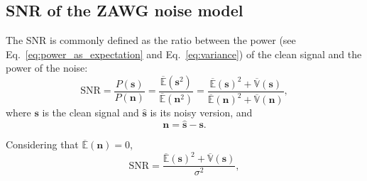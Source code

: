 \begin{comment}
If $\mathbf{s}=\mathbf{0}$ (a constant signal
with zeros), Equations \ref{eq:E_ZAWG} and \ref{eq:V_ZAWG}
reduce to
\begin{equation}
  \mathbb{E}(\mathbf{\hat{\mathbf{s}}}) = 0,
\end{equation}
and
\begin{equation}
  \mathbb{V}(\hat{\mathbf{s}}) = \sigma^2,
\end{equation}
respectively, and if $\mathbf{s}=\mathbf{1}$ (a constant signal with
ones)
\begin{equation}
  \mathbb{E}(\hat{\mathbf{s}}) = \mathbb{E}(\mathbf{1}) = 1,
\end{equation}
and
\begin{equation}
  \mathbb{V}(\hat{\mathbf{s}}) = \sigma^2.
\end{equation}
\end{comment}

\subsection{\gls{SNR} of the \gls{ZAWG} noise model}

The \gls{SNR} is commonly defined as the ratio between the power (see
Eq.~\ref{eq:power_as_expectation} and Eq.~\ref{eq:variance}) of the
clean signal and the power of the noise:
\begin{equation}
  \text{SNR} = \frac{P(\mathbf{s})}{P(\mathbf{n})} = \frac{\overline{\mathbb{E}}(\mathbf{s}^2)}{\overline{\mathbb{E}}(\mathbf{n}^2)} = \frac{\overline{\mathbb{E}}(\mathbf{s})^2+\overline{\mathbb{V}}(\mathbf{s})}{\overline{\mathbb{E}}(\mathbf{n})^2+\overline{\mathbb{V}}(\mathbf{n})},
  \label{eq:SNR}
\end{equation}
where $\mathbf{s}$ is the clean signal and $\hat{\mathbf{s}}$ is its
noisy version, and
\begin{equation}
  \mathbf{n} = \hat{\mathbf{s}} - \mathbf{s}.
\end{equation}

Considering that $\overline{\mathbb{E}}(\mathbf{n}) = 0$,
\begin{equation}
  \text{SNR} = \frac{\overline{\mathbb{E}}(\mathbf{s})^2 + \overline{\mathbb{V}}(\mathbf{s})}{\sigma^2},
\end{equation}

